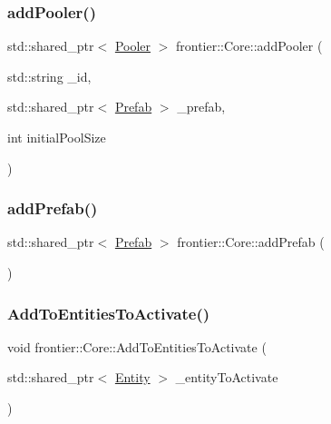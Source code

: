 \mbox{\label{classfrontier_1_1_core_a3447ae6e6cbb79e89e78fbdab36ce743}} 
\subsubsection{\texorpdfstring{add\+Pooler()}{addPooler()}}
{\footnotesize\ttfamily std\+::shared\+\_\+ptr$<$ \hyperlink{classfrontier_1_1_pooler}{Pooler} $>$ frontier\+::\+Core\+::add\+Pooler (\begin{DoxyParamCaption}\item[{std\+::string}]{\+\_\+id,  }\item[{std\+::shared\+\_\+ptr$<$ \hyperlink{classfrontier_1_1_prefab}{Prefab} $>$}]{\+\_\+prefab,  }\item[{int}]{initial\+Pool\+Size }\end{DoxyParamCaption})}

\mbox{\label{classfrontier_1_1_core_af3e1d6b2e67d82f6cd34af637da7d957}} 
\subsubsection{\texorpdfstring{add\+Prefab()}{addPrefab()}}
{\footnotesize\ttfamily std\+::shared\+\_\+ptr$<$ \hyperlink{classfrontier_1_1_prefab}{Prefab} $>$ frontier\+::\+Core\+::add\+Prefab (\begin{DoxyParamCaption}{ }\end{DoxyParamCaption})}

\mbox{\label{classfrontier_1_1_core_a0d510b25cca36dddb10b562913ae24c7}} 
\subsubsection{\texorpdfstring{Add\+To\+Entities\+To\+Activate()}{AddToEntitiesToActivate()}}
{\footnotesize\ttfamily void frontier\+::\+Core\+::\+Add\+To\+Entities\+To\+Activate (\begin{DoxyParamCaption}\item[{std\+::shared\+\_\+ptr$<$ \hyperlink{classfrontier_1_1_entity}{Entity} $>$}]{\+\_\+entity\+To\+Activate }\end{DoxyParamCaption})}


